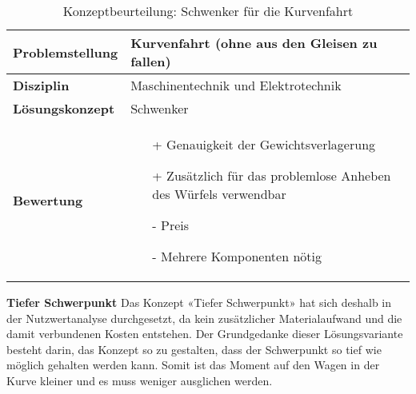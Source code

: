 \documentclass[../../main.tex]{subfiles}
\begin{document}
    \begin{flushleft}
        \begin{table}[h]
        \begin{tabular}{ | l | p{11cm} |}
        \hline
        \textbf{Problemstellung} & Kurvenfahrt (ohne aus den Gleisen zu fallen) \\ \hline
        \textbf{Disziplin} & Maschinentechnik und Elektrotechnik \\ \hline
        \textbf{Lösungskonzept} & Schwenker \\ \hline
        \textbf{Bewertung} &  \begin{itemize}
                                \item[+] Genauigkeit der Gewichtsverlagerung
                                \item[+] Zusätzlich für das problemlose Anheben des Würfels verwendbar
                                \item[-] Preis 
                                \item[-] Mehrere Komponenten nötig 
                              \end{itemize} \\ \hline
        \end{tabular}
        \caption{Konzeptbeurteilung: Schwenker für die Kurvenfahrt}
        \label{tab:konzept_fahrwerk_schwenker}
    \end{table}
    \end{flushleft}

    \textbf{Tiefer Schwerpunkt}
    Das Konzept «Tiefer Schwerpunkt» hat sich deshalb in der Nutzwertanalyse durchgesetzt, da kein zusätzlicher Materialaufwand und die damit verbundenen Kosten entstehen. Der Grundgedanke dieser Lösungsvariante besteht darin, das Konzept so zu gestalten, dass der Schwerpunkt so tief wie möglich gehalten werden kann. Somit ist das Moment auf den Wagen in der Kurve kleiner und es muss weniger ausglichen werden.
\end{document}
